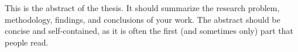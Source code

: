 This is the abstract of the thesis. It should summarize the research problem, methodology, 
findings, and conclusions of your work. The abstract should be concise and 
self-contained, as it is often the first (and sometimes only) part that people read.
\lipsum[1]
